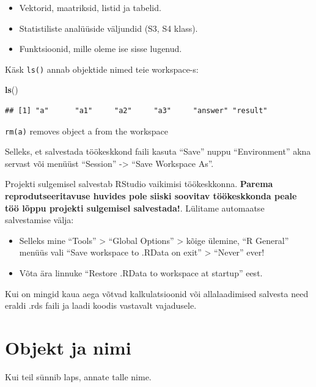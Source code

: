\documentclass[]{book}
\newenvironment{Shaded}{\begin{snugshade}}{\end{snugshade}}
\newcommand{\KeywordTok}[1]{\textcolor[rgb]{0.13,0.29,0.53}{\textbf{#1}}}
\newcommand{\NormalTok}[1]{#1}
\providecommand{\tightlist}{%
  \setlength{\itemsep}{0pt}\setlength{\parskip}{0pt}}
\begin{document}
\begin{itemize}
\tightlist
\item
  Vektorid, maatriksid, listid ja tabelid.
\item
  Statistiliste analüüside väljundid (S3, S4 klass).
\item
  Funktsioonid, mille oleme ise sisse lugenud.
\end{itemize}

Käsk \texttt{ls()} annab objektide nimed teie workspace-s:

\begin{Shaded}
\begin{Highlighting}[]
\KeywordTok{ls}\NormalTok{()}
\end{Highlighting}
\end{Shaded}

\begin{verbatim}
## [1] "a"      "a1"     "a2"     "a3"     "answer" "result"
\end{verbatim}

\texttt{rm(a)} removes object a from the workspace

Selleks, et salvestada töökeskkond faili kasuta ``Save'' nuppu
``Environment'' akna servast või menüüst ``Session'' -\textgreater{}
``Save Workspace As''.

Projekti sulgemisel salvestab RStudio vaikimisi töökeskkonna.
\textbf{Parema reprodutseeritavuse huvides pole siiski soovitav
töökeskkonda peale töö lõppu projekti sulgemisel salvestada!}. Lülitame
automaatse salvestamise välja:

\begin{itemize}
\tightlist
\item
  Selleks mine ``Tools'' \textgreater{} ``Global Options''
  \textgreater{} kõige ülemine, ``R General'' menüüs vali ``Save
  workspace to .RData on exit'' \textgreater{} ``Never'' ever!
\item
  Võta ära linnuke ``Restore .RData to workspace at startup'' eest.
\end{itemize}

Kui on mingid kaua aega võtvad kalkulatsioonid või allalaadimised
salvesta need eraldi .rds faili ja laadi koodis vastavalt vajadusele.

\section{Objekt ja nimi}\label{objekt-ja-nimi}

Kui teil sünnib laps, annate talle nime.
\end{document}
